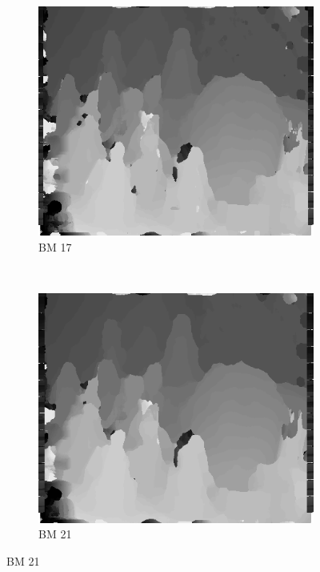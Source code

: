 \begin{figure}
  ~
  \begin{subfigure}[b]{0.23\textwidth}
    \centering
    \includegraphics[width=\textwidth]{images/stereo-pairs/cones_bm_17.png}
    \caption{BM 17}
  \end{subfigure}
  ~
  \begin{subfigure}[b]{0.23\textwidth}
    \centering
    \includegraphics[width=\textwidth]{images/stereo-pairs/cones_bm_21.png}
    \caption{BM 21}
  \end{subfigure}



\end{figure}

